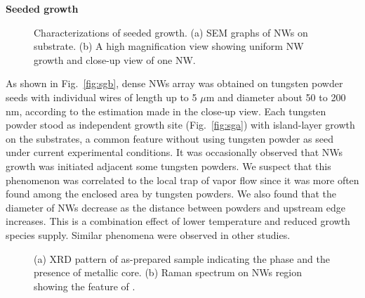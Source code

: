 \documentclass[11pt]{article} %
\begin{document}
\textbf{Seeded growth}

\begin{figure}[htb]
\centering
{}\hspace{0.04\textwidth}
\caption[Characterization of seeded growth : SEM]{Characterizations of seeded growth. (a) SEM graphs of  NWs on  substrate. (b) A high magnification view showing uniform NW growth and close-up view of one NW. }
\label{fig:woseedsem}
\end{figure}

As shown in Fig.~\ref{fig:sgb}, dense NWs array was obtained on tungsten powder seeds with individual wires of length up to 5 $\mu$m and diameter about 50 to 200 nm, according to the estimation made in the close-up view. Each tungsten powder stood as independent growth site (Fig.~\ref{fig:sga}) with island-layer growth on the substrates, a common feature without using tungsten powder as seed under current experimental conditions. It was occasionally observed that NWs growth was initiated adjacent some tungsten powders. We suspect that this phenomenon was correlated to the local trap of vapor flow since it was more often found among the enclosed area by tungsten powders. We also found that the diameter of NWs decrease as the distance between powders and upstream edge increases. This is a combination effect of lower temperature and reduced  growth species supply. Similar phenomena were observed in other studies.\cite{Thangala2007}

\begin{figure}[htb]
\centering
{}\hspace{0.04\textwidth}
\caption[Characterization of seeded growth : XRD and Raman]{ (a) XRD pattern of as-prepared sample indicating the  phase and the presence of metallic core. (b) Raman spectrum on NWs region showing the feature of .}
\label{fig:woseedxrd}
\end{figure}
\end{document}
